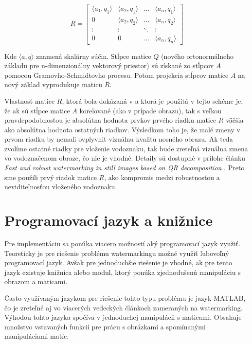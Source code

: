\begin{equation}
R = \begin{bmatrix} 
\langle a_1, q_1 \rangle & \langle a_2, q_1 \rangle & \dots & \langle a_n, q_1 \rangle \\
0 & \langle a_2, q_2 \rangle & \dots & \langle a_n, q_2 \rangle \\
\vdots & \vdots & \ddots & \vdots \\
0 & 0 & \dots & \langle a_n, q_n \rangle
\end{bmatrix}
\end{equation}

Kde $\langle a,q\rangle$ znamená skalárny súčin. Stĺpce matice $Q$ (nového ortonormálneho základu pre n-dimenzionálny vektorový priestor) sú získané zo stĺpcov $A$ pomocou Gramovho-Schmidtovho procesu. Potom projekcia stĺpcov matice $A$ na nový základ vyprodukuje maticu $R$.

Vlastnosť matice $R$, ktorá bola dokázaná v \cite{QRdecomposition} a ktorá je použitá v tejto schéme je, že ak sú stĺpce matice $A$ korelované (ako v prípade obrazu), tak s veľkou pravdepodobnosťou je absolútna hodnota prvkov prvého riadku matice $R$ väčšia ako absolútna hodnota ostatných riadkov. Výsledkom toho je, že malé zmeny v prvom riadku by nemali ovplyvniť vizuálnu kvalitu nosného obrazu. Ak teda zvolíme ostatné riadky pre vloženie vodoznaku, tak bude zreteľná vizuálna zmena vo vodoznačenom obraze, čo nie je vhodné. Detaily sú dostupné v prílohe článku {\it Fast and robust watermarking in still images based on QR decomposition} \cite{QRdecomposition}. Preto sme použili prvý riadok matice $R$, ako kompromis medzi robustnosťou a neviditeľnosťou vloženého vodoznaku.


\section{Programovací jazyk a knižnice} \label{kniznice}
Pre implementáciu sa ponúka viacero možností aký programovací jazyk využiť. Teoreticky je pre riešenie problému watermarkingu možné využiť ľubovoľný programovací jazyk. Avšak pre jednoduchšie riešenie je vhodné, ak pre tento jazyk existuje knižnica alebo modul, ktorý ponúka zjednodušenú manipuláciu s obrazom a maticami.

Často využívaným jazykom pre riešenie tohto typu problému je jazyk MATLAB, čo je zreteľné aj vo viacerých vedeckých článkoch zameraných na watermarking. Výhodou tohto jazyka spočíva v jednoduchej manipulácii s maticami. Obsahuje množstvo vstavaných funkcií pre prácu s obrázkami a spomínanými manipuláciami matíc.


